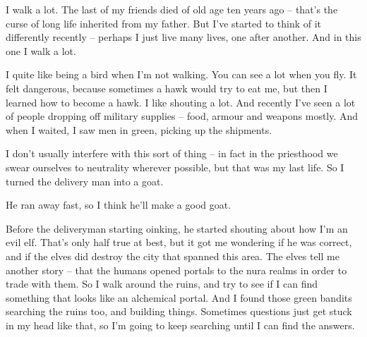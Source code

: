 \begin{multicols}{2}
\begin{exampletext}

  I walk a lot.
  The last of my friends died of old age ten years ago -- that's the curse of long life inherited from my father.
  But I've started to think of it differently recently -- perhaps I just live many lives, one after another.
  And in this one I walk a lot.

  I quite like being a bird when I'm not walking.
  You can see a lot when you fly.
  It felt dangerous, because sometimes a hawk would try to eat me, but then I learned how to become a hawk.
  I like shouting a lot.
  And recently I've seen a lot of people dropping off military supplies -- food, armour and weapons mostly.
  And when I waited, I saw men in green, picking up the shipments.
  
  I don't usually interfere with this sort of thing -- in fact in the priesthood we swear ourselves to neutrality wherever possible, but that was my last life.
  So I turned the delivery man into a goat.

  He ran away fast, so I think he'll make a good goat.

  Before the deliveryman starting oinking, he started shouting about how I'm an evil elf.
  That's only half true at best, but it got me wondering if he was correct, and if the elves did destroy the city that spanned this area.
  The elves tell me another story -- that the humans opened portals to the nura realms in order to trade with them.
  So I walk around the ruins, and try to see if I can find something that looks like an alchemical portal.
  And I found those green bandits searching the ruins too, and building things.
  Sometimes questions just get stuck in my head like that, so I'm going to keep searching until I can find the answers.

\end{exampletext}

\end{multicols}

